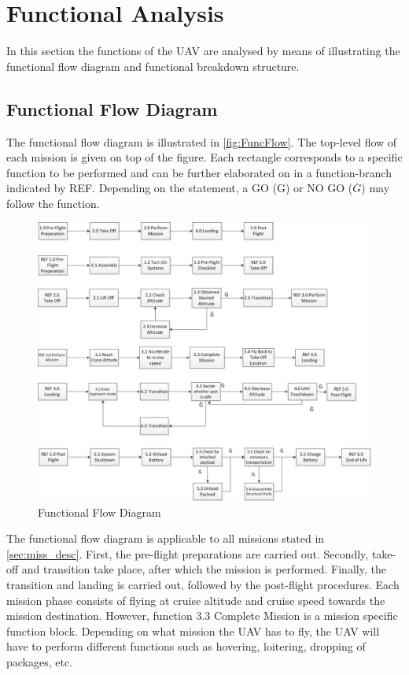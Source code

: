 \section{Functional Analysis}
\label{ch:func_anal}
\setlength{\parindent}{15pt}

In this section the functions of the UAV are analysed by means of illustrating the functional flow diagram and functional breakdown structure. 

\subsection{Functional Flow Diagram}

The functional flow diagram is illustrated in \autoref{fig:FuncFlow}. The top-level flow of each mission is given on top of the figure. Each rectangle corresponds to a specific function to be performed and can be further elaborated on in a function-branch indicated by REF. Depending on the statement, a GO (G) or NO GO ($\overline{G}$) may follow the function. 

\begin{figure}[htb]
\centering
\includegraphics[width=\textwidth]{./ProjectDescription/Figures/ALL}
\caption{Functional Flow Diagram}
\label{fig:FuncFlow}
\end{figure}

The functional flow diagram is applicable to all missions stated in \autoref{sec:miss_desc}. First, the pre-flight preparations are carried out. Secondly, take-off and transition take place, after which the mission is performed. Finally, the transition and landing is carried out, followed by the post-flight procedures. Each mission phase consists of flying at cruise altitude and cruise speed towards the mission destination. However, function 3.3 Complete Mission is a mission specific function block. Depending on what mission the UAV has to fly, the UAV will have to perform different functions such as hovering, loitering, dropping of packages, etc.

